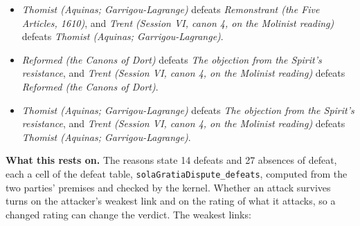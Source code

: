 \documentclass[11pt]{article}
\begin{document}
\begin{itemize}
\begin{itemize}
\item \emph{Thomist (Aquinas; Garrigou-Lagrange)} defeats \emph{Remonstrant (the Five Articles, 1610)}, and \emph{Trent (Session VI, canon 4, on the Molinist reading)} defeats \emph{Thomist (Aquinas; Garrigou-Lagrange)}.
\item \emph{Reformed (the Canons of Dort)} defeats \emph{The objection from the Spirit’s resistance}, and \emph{Trent (Session VI, canon 4, on the Molinist reading)} defeats \emph{Reformed (the Canons of Dort)}.
\item \emph{Thomist (Aquinas; Garrigou-Lagrange)} defeats \emph{The objection from the Spirit’s resistance}, and \emph{Trent (Session VI, canon 4, on the Molinist reading)} defeats \emph{Thomist (Aquinas; Garrigou-Lagrange)}.
\end{itemize}
\end{itemize}
\par\noindent\textbf{What this rests on.} The reasons state 14 defeats and 27 absences of defeat, each a cell of the defeat table, \texttt{sola\allowbreak{}Gratia\allowbreak{}Dispute\_\allowbreak{}defeats}, computed from the two parties' premises and checked by the kernel. Whether an attack survives turns on the attacker's weakest link and on the rating of what it attacks, so a changed rating can change the verdict. The weakest links:
\end{document}
